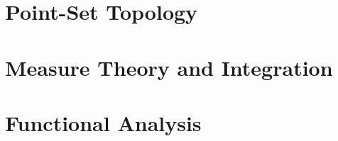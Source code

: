 \documentclass[10pt]{package2}
\begin{document}
\chapter{Point-Set Topology}\label{ch:point_set_topology}

\chapter{Measure Theory and Integration}\label{ch:measure_theory}

\chapter{Functional Analysis}\label{ch:functional_analysis}

\nocite{*}
\printbibliography
\end{document}
